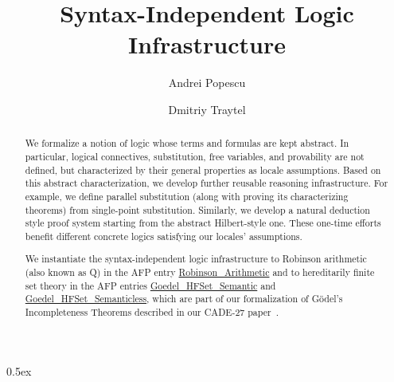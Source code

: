 \documentclass[10pt,a4paper]{report}
\begin{document}
\title{Syntax-Independent Logic Infrastructure}
\author{Andrei Popescu \and Dmitriy Traytel}

\maketitle

\begin{abstract} We formalize a notion of logic whose terms and formulas are kept abstract. In particular,
logical connectives, substitution, free variables, and provability are not defined, but characterized by
their general properties as locale assumptions. Based on this abstract characterization, we develop further
reusable reasoning infrastructure. For example, we define parallel substitution (along with proving its
characterizing theorems) from single-point substitution. Similarly, we develop a natural
deduction style proof system starting from the abstract Hilbert-style one. These one-time efforts benefit
different concrete logics satisfying our locales' assumptions.

We instantiate the syntax-independent logic infrastructure to Robinson arithmetic (also known as Q) in the
AFP entry \href{https://www.isa-afp.org/entries/Robinson_Arithmetic.html}{Robinson\_Arithmetic} and to
hereditarily finite set theory in the AFP entries
\href{https://www.isa-afp.org/entries/Goedel_HFSet_Semantic.html}{Goedel\_HFSet\_Semantic} and
\href{https://www.isa-afp.org/entries/Goedel_HFSet_Semanticless.html}{Goedel\_HFSet\_Semanticless}, which are
part of our formalization of G\"odel's Incompleteness Theorems described in our CADE-27
paper~\cite{DBLP:conf/cade/0001T19}. \end{abstract}

\tableofcontents

\parindent 0pt\parskip 0.5ex





\end{document}
